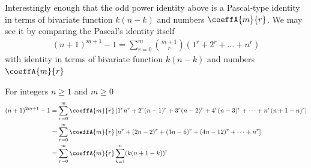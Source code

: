 Interestingly enough that the odd power identity above is a Pascal-type identity
in terms of bivariate function $k(n-k)$ and numbers $\coeffA{m}{r}$.
We may see it by comparing the Pascal's identity itself~\cite{macmillan2011proofs}
\begin{align*}
(n+1)
    ^{m+1}-1 = \sum_{r=0}^{m} \binom{m+1}{r} \left( 1^{r}+2^{r} + \dots + n^{r} \right)
\end{align*}
with identity in terms of bivariate function $k(n-k)$ and numbers $\coeffA{m}{r}$
\begin{corollary}
    \label{cor:bibariate-pascals-identity}
    For integers $n \geq 1$ and $m\geq 0$
    \begin{align*}
    (n+1)
        ^{2m+1} - 1
        &= \sum_{r=0}^{m} \coeffA{m}{r} \left[ 1^r n^r + 2^r (n-1)^r + 3^r (n-2)^r + 4^r (n-3)^r + \cdots + n^r (n+1-n)^r  \right] \\
        &= \sum_{r=0}^{m} \coeffA{m}{r} \left[ n^r + (2n-2)^r + (3n-6)^r + (4n-12)^r + \cdots + n^r  \right] \\
        &= \sum_{r=0}^{m} \coeffA{m}{r} \sum_{k=1}^{n} (k (n+1-k))^r
    \end{align*}
\end{corollary}
